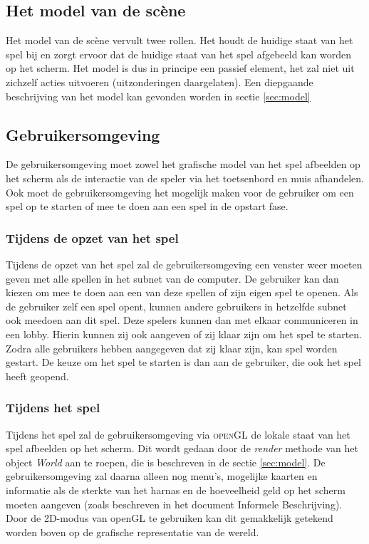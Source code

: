 \documentclass[a4paper,11pt]{article}
\begin{document}
    \subsection{Het model van de sc\`ene}
    Het model van de sc\`ene vervult twee rollen. Het houdt de huidige staat van het spel bij en zorgt ervoor dat de huidige staat van het spel afgebeeld kan worden op het scherm. Het model is dus in principe een passief element, het zal niet uit zichzelf acties uitvoeren (uitzonderingen daargelaten). Een diepgaande beschrijving van het model kan gevonden worden in sectie \ref{sec:model}

    \subsection{Gebruikersomgeving}
   	De gebruikersomgeving moet zowel het grafische model van het spel afbeelden op het scherm als de interactie van de speler via het toetsenbord en muis afhandelen. Ook moet de gebruikersomgeving het mogelijk maken voor de gebruiker om een spel op te starten of mee te doen aan een spel in de opstart fase.

    \subsubsection{Tijdens de opzet van het spel}
    Tijdens de opzet van het spel zal de gebruikersomgeving een venster weer moeten geven met alle spellen in het subnet van de computer. De gebruiker kan dan kiezen om mee te doen aan een van deze spellen of zijn eigen spel te openen. Als de gebruiker zelf een spel opent, kunnen andere gebruikers in hetzelfde subnet ook meedoen aan dit spel. Deze spelers kunnen dan met elkaar communiceren in een lobby. Hierin kunnen zij ook aangeven of zij klaar zijn om het spel te starten. Zodra alle gebruikers hebben aangegeven dat zij klaar zijn, kan spel worden gestart. De keuze om het spel te starten is dan aan de gebruiker, die ook het spel heeft geopend.

    \subsubsection{Tijdens het spel}
    Tijdens het spel zal de gebruikersomgeving via \textsc{openGL} de lokale staat van het spel afbeelden op het scherm. Dit wordt gedaan door de \emph{render} methode van het object \emph{World} aan te roepen, die is beschreven in de sectie \ref{sec:model}. De gebruikersomgeving zal daarna alleen nog menu's, mogelijke kaarten en informatie als de sterkte van het harnas en de hoeveelheid geld op het scherm moeten aangeven (zoals beschreven in het document Informele Beschrijving). Door de 2D-modus van openGL te gebruiken kan dit gemakkelijk getekend worden boven op de grafische representatie van de wereld.
\end{document}
